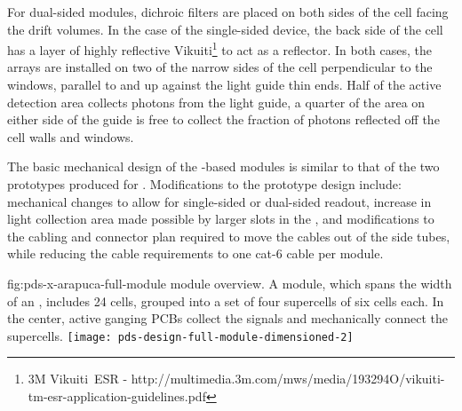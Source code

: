 For dual-sided  modules, dichroic filters are placed on both sides of the cell facing the drift volumes.  In the case of the single-sided device, the back side of the cell has a layer of highly reflective Vikuiti\footnote{3M Vikuiti\texttrademark\  ESR - http://multimedia.3m.com/mws/media/193294O/vikuiti-tm-esr-application-guidelines.pdf} to act as %
a  reflector.  In both cases, the  arrays are installed on two of the narrow sides of the cell perpendicular to the windows, parallel to and up against the light guide thin ends. Half of the  active detection area collects photons from the light guide, a quarter of the area on either side of the guide is free to collect the fraction of photons reflected off the cell walls and windows. 

The basic mechanical design of the -based  modules  
is similar to that of the two prototypes produced for . Modifications to the prototype design include:  mechanical changes to allow for single-sided or dual-sided readout, increase in light collection area made possible by larger slots in the , and modifications to the cabling and connector plan required to move the  cables out of the  side tubes, while reducing the cable requirements to one cat-6 cable per  module.



\begin{dunefigure}
{fig:pds-x-arapuca-full-module}
{ module overview. A module, which spans the width of an , includes 24
  cells, grouped into a set of four supercells of six cells each. In the center, active ganging PCBs collect the signals and mechanically connect the supercells.}
   \texttt{[image: pds-design-full-module-dimensioned-2]}
\end{dunefigure}


